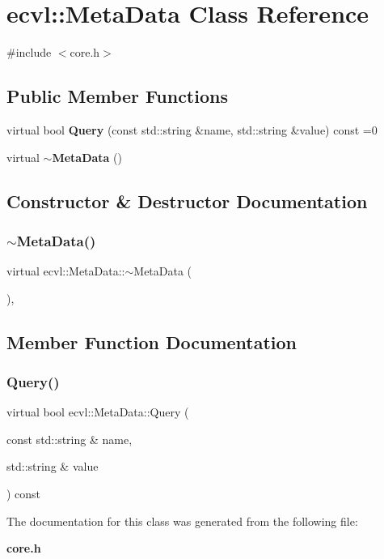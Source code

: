 \section{ecvl\+::Meta\+Data Class Reference}
\label{classecvl_1_1_meta_data}


{\ttfamily \#include $<$core.\+h$>$}

\subsection*{Public Member Functions}
\begin{DoxyCompactItemize}
\item 
virtual bool \textbf{ Query} (const std\+::string \&name, std\+::string \&value) const =0
\item 
virtual \textbf{ $\sim$\+Meta\+Data} ()
\end{DoxyCompactItemize}


\subsection{Constructor \& Destructor Documentation}
\mbox{\label{classecvl_1_1_meta_data_a53dd49f5c867029c23dcfab7a88709fa}} 
\subsubsection{$\sim$MetaData()}
{\footnotesize\ttfamily virtual ecvl\+::\+Meta\+Data\+::$\sim$\+Meta\+Data (\begin{DoxyParamCaption}{ }\end{DoxyParamCaption})\hspace{0.3cm}{\ttfamily [inline]}, {\ttfamily [virtual]}}



\subsection{Member Function Documentation}
\mbox{\label{classecvl_1_1_meta_data_a5f12fad6548dfa7da9920957e68a5d70}} 
\subsubsection{Query()}
{\footnotesize\ttfamily virtual bool ecvl\+::\+Meta\+Data\+::\+Query (\begin{DoxyParamCaption}\item[{const std\+::string \&}]{name,  }\item[{std\+::string \&}]{value }\end{DoxyParamCaption}) const\hspace{0.3cm}{\ttfamily [pure virtual]}}



The documentation for this class was generated from the following file\+:\begin{DoxyCompactItemize}
\item 
\textbf{ core.\+h}\end{DoxyCompactItemize}

